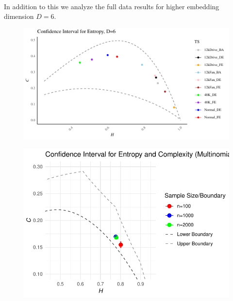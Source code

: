 \documentclass{beamer}
\begin{document}
\begin{frame}
	In addition to this we analyze the full data results for higher embedding dimension $D=6$.
		\begin{figure}[hbt]
		\centering
		\includegraphics[width=0.8 \textwidth]{Confidence Interval}
		\label{fig:EntopyComplexity Plane D=6}
	\end{figure}
\end{frame}

\begin{frame}
	\begin{figure}[hbt]
		\centering
		\includegraphics[width=0.8 \textwidth]{CI for Multinomial model}
	\end{figure}
\end{frame}
\end{document}
